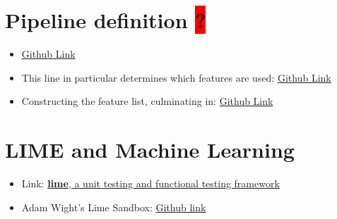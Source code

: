 \documentclass[12pt,a4paper]{article}
\begin{document}
\section{Pipeline definition \colorbox{red}{?}}
\begin{itemize}
\item \href{https://github.com/wikimedia/articlequality/blob/master/Makefile#L572-L651}{Github Link}
\item This line in particular determines which features are used: \href{https://github.com/wikimedia/articlequality/blob/master/Makefile#L637}{Github Link}
\item Constructing the feature list, culminating in: \href{https://github.com/wikimedia/articlequality/blob/master/articlequality/feature_lists/wikidatawiki.py#L166}{Github Link}
\end{itemize}
%
%
\section{LIME and Machine Learning}
\begin{itemize}
\item Link: \href{https://en.wikipedia.org/wiki/Lime_(software)}{\textbf{lime}, a unit testing and functional testing framework}
\item Adam Wight's Lime Sandbox: \href{https://github.com/adamwight/ores-lime/}{Github link}
\end{itemize}
\end{document}
